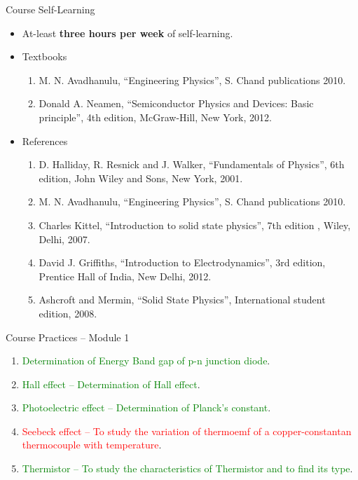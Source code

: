 \begin{frame}{Course Self-Learning}
	\vspace{-0.5em}
	{
		\footnotesize
\begin{itemize}
	\item At-least \textbf{three hours per week} of self-learning.
	\item	Textbooks
		\begin{enumerate}
			\item M. N. Avadhanulu, “Engineering Physics”, S. Chand publications 2010.
			\item Donald A. Neamen, “Semiconductor Physics and Devices: Basic principle”, 4th edition, McGraw-Hill, New York, 2012.
		\end{enumerate}
	\item References
		\begin{enumerate}
			\item D. Halliday, R. Resnick and J. Walker, “Fundamentals of Physics”, 6th edition, John Wiley and Sons, New York, 2001.
			\item M. N. Avadhanulu, “Engineering Physics”, S. Chand publications 2010.
			\item Charles Kittel, “Introduction to solid state physics”, 7th edition , Wiley, Delhi, 2007.
			\item David J. Griffiths, “Introduction to Electrodynamics”, 3rd edition, Prentice Hall of India, New Delhi, 2012.
			\item Ashcroft and Mermin, “Solid State Physics”, International student edition, 2008.
		\end{enumerate}
\end{itemize}
	}
\end{frame}
%
\begin{frame}{Course Practices -- Module 1}
	\begin{enumerate}
		\item \textcolor{green}{Determination of Energy Band gap of p-n junction diode}.
		\item \textcolor{green}{Hall effect -- Determination of Hall effect}.
		\item \textcolor{green}{Photoelectric effect -- Determination of Planck's constant}.
		\item \textcolor{red}{Seebeck effect -- To study the variation of thermoemf of a copper-constantan thermocouple with temperature}.
		\item \textcolor{green}{Thermistor -- To study the characteristics of Thermistor and to find its type}.
	\end{enumerate}
\end{frame}
